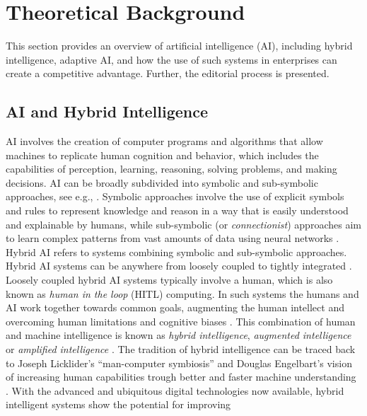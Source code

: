 \section{Theoretical Background}
\label{sec:literature}

This section provides an overview of artificial intelligence (AI), including hybrid intelligence, adaptive AI,
and how the use of such systems in enterprises can create a competitive advantage. Further, the editorial process 
is presented.

\subsection{AI and Hybrid Intelligence}

AI involves the creation of computer programs and algorithms that allow machines to replicate human cognition and behavior,
which includes the capabilities of perception, learning, reasoning, solving problems, and making decisions. AI can be broadly
subdivided into symbolic and sub-symbolic approaches, see e.g., \cite{eliasmithSymbolicSubsymbolic2006}. Symbolic approaches
involve the use of explicit symbols and rules to represent knowledge and reason in a way that is easily understood and explainable
by humans, while sub-symbolic (or \textit{connectionist}) approaches aim to learn complex patterns from vast amounts of data
using neural networks \citep{ilkouSymbolicVsSubsymbolic2020}. Hybrid AI refers to systems combining symbolic and sub-symbolic
approaches. Hybrid AI systems can be anywhere from loosely coupled to tightly integrated \citep{garcezNeurosymbolicAI3rd2023}.
Loosely coupled hybrid AI systems typically involve a human, which is also known as \textit{human in the loop} (HITL)
computing. In such systems the humans and AI work together towards common goals, augmenting the human intellect and
overcoming human limitations and cognitive biases \citep{akataResearchAgendaHybrid2020a}. This combination of human and machine
intelligence is known as \textit{hybrid intelligence}, \textit{augmented intelligence} or \textit{amplified intelligence}
\citep{schmidtAugmentingHumanIntellect2017,akataResearchAgendaHybrid2020a,zhouIntelligenceAugmentationBuilding2021}.
The tradition of hybrid intelligence can be traced back to Joseph Licklider's ``man-computer symbiosis'' and Douglas Engelbart's
vision of increasing human capabilities trough better and faster machine understanding \citep[and references cited therein]{schmidtAugmentingHumanIntellect2017}.
With the advanced and ubiquitous digital technologies now available, hybrid intelligent systems show the potential for improving
